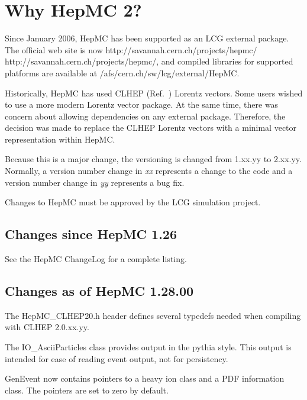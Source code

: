 \documentclass[11pt,letterpaper]{article}
\begin{document}
%
%

\section{Why HepMC 2?}

Since January 2006, HepMC has been supported as an LCG external package.
The official web site is now \htmladdnormallink 
{http://savannah.cern.ch/projects/hepmc/} 
{http://savannah.cern.ch/projects/hepmc/}, 
and compiled libraries for supported platforms are available at 
/afs/cern.ch/sw/lcg/external/HepMC.

Historically, HepMC has used CLHEP (Ref.~\cite{clhep}) Lorentz vectors.  Some users wished to use
a more modern Lorentz vector package.  At the same time, 
there was concern about allowing dependencies on any external package.  
Therefore, the decision was made to replace the CLHEP Lorentz vectors with
a minimal vector representation within HepMC.  

Because this is a major change, the versioning is changed 
from 1.xx.yy to 2.xx.yy.  Normally, a version number change in \emph{xx} 
represents a change to the code and a version number change in \emph{yy}
represents a bug fix.

Changes to HepMC must be approved by the LCG simulation project.  

%
%

\subsection{Changes since HepMC 1.26}

See the HepMC ChangeLog for a complete listing.

%
%

\subsection{Changes as of HepMC 1.28.00}

The HepMC\_CLHEP20.h header defines several typedefs needed when 
compiling with CLHEP 2.0.xx.yy.

The IO\_AsciiParticles class provides output in the pythia style.
This output is intended for ease of reading event output, not for persistency.

GenEvent now contains pointers to a heavy ion class and a PDF information class.
The pointers are set to zero by default.
\end{document}

